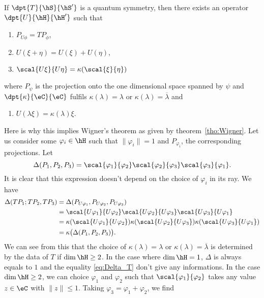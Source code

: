 \begin{theorem}
If $\dpt{T}{\hS}{\hS'}$ is a quantum symmetry, then there exists an operator $\dpt{U}{\hH}{\hH'}$ such that
\begin{enumerate}
\item $P_{U\phi}=TP_{\phi}$,
\item $U(\xi+\eta)=U(\xi)+U(\eta)$,
\item $\scal{U\xi}{U\eta}=\kappa(\scal{\xi}{\eta})$ \label{item:cond_3}
\end{enumerate}
where $P_{\psi}$ is the projection onto the one dimensional space spanned by $\psi$ and $\dpt{\kappa}{\eC}{\eC}$ fulfils $\kappa(\lambda)=\lambda$ or $\kappa(\lambda)=\overline{\lambda}$ and

\begin{enumerate}
\item $U(\lambda\xi)=\kappa(\lambda)\xi$.
\end{enumerate}
\label{tho:pre_Wigner}
\end{theorem}
Here is why this implies Wigner's theorem as given by theorem~\ref{tho:Wigner}. Let us consider some $\varphi_i\in\hH$ such that $\|\varphi_i\|=1$ and $P_{\varphi_i}$, the corresponding projections. Let
\[
   \Delta(P_1,P_2,P_3)=\scal{\varphi_1}{\varphi_2}\scal{\varphi_2}{\varphi_3}\scal{\varphi_3}{\varphi_1}.
\]
It is clear that this expression doesn't depend on the choice of $\varphi_i$ in its ray. We have
\begin{equation}\label{eq:Delta_T}
\begin{split}
\Delta(TP_1;TP_2,TP_3)&=\Delta(P_{U\varphi_1},P_{U\varphi_2},P_{U\varphi_3})\\
                      &=\scal{U\varphi_1}{U\varphi_2}\scal{U\varphi_2}{U\varphi_3}\scal{U\varphi_3}{U\varphi_1}\\
		      &=\kappa(\scal{U\varphi_1}{U\varphi_2})\kappa(\scal{U\varphi_2}{U\varphi_3})\kappa(\scal{U\varphi_3}{U\varphi_1})\\
		      &=\kappa\big(\Delta(P_1,P_2,P_3)\big).
\end{split}
\end{equation}
We can see from this that the choice of $\kappa(\lambda)=\lambda$ or $\kappa(\lambda)=\overline{\lambda}$ is determined by the data of $T$ if $\dim\hH\geq 2$. In the case where $\dim\hH=1$, $\Delta$ is always equals to $1$ and the equality \eqref{eq:Delta_T} don't give any informations. In the case $\dim\hH\geq 2$, we can choice $\varphi_1$ and $\varphi_2$ such that $\scal{\varphi_1}{\varphi_2}$ takes any value $z\in\eC$ with $\|z\|\leq 1$. Taking $\varphi_3=\varphi_1+\varphi_2$, we find
